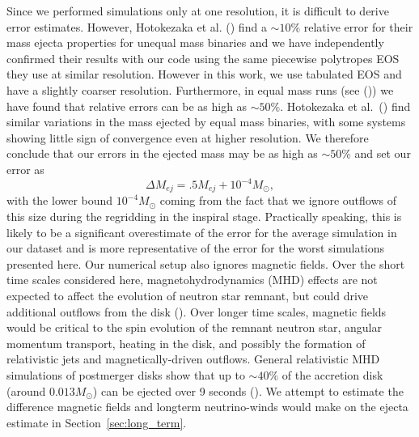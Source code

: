 Since we performed simulations only at one resolution, it is difficult to derive error estimates. However, Hotokezaka et al. (\cite{hotokezaka:13}) find a $\sim 10\%$ relative error for their mass ejecta properties for unequal mass binaries and we have independently confirmed their results with our code using the same piecewise polytropes EOS they use at similar resolution. However in this work, we use tabulated EOS and have a slightly coarser resolution. Furthermore, in equal mass runs (see (\cite{foucart:2015gaa})) we have found that relative errors can be as high as $\sim 50\%$. Hotokezaka et al.~(\cite{hotokezaka:13}) find similar variations in the mass ejected by equal mass binaries, with some systems showing little sign of convergence even at higher resolution. We therefore conclude that our errors in the ejected mass may be as high as $\sim 50\%$ and set our error as
%
\begin{equation}
\label{eqn:error}
  \Delta M_{ej} = .5M_{ej} + 10^{-4}M_\odot,
\end{equation}
%
with the lower bound $10^{-4}M_\odot$ coming from the fact that we ignore outflows of this size during the regridding in the inspiral stage. Practically speaking, this is likely to be a significant overestimate of the error for the average simulation in our dataset and is more representative of the error for the worst simulations presented here. %
Our numerical setup also ignores magnetic fields. Over the short time scales considered here, magnetohydrodynamics (MHD) effects are not expected to affect the evolution of neutron star remnant, but could drive additional outflows from the disk (\cite{kiuchi2014,neilsen2014magnetized}). Over longer time scales, magnetic fields would be critical to the spin evolution of the remnant neutron star, angular momentum transport, heating in the disk, and possibly the formation of relativistic jets and magnetically-driven outflows. General relativistic MHD simulations of postmerger disks show
that up to $\sim 40\%$ of the accretion disk (around $0.013M_\odot$) can be ejected over 9 seconds (\cite{fernandez2019long}). We attempt to estimate the difference magnetic fields and longterm neutrino-winds would make on the ejecta estimate in Section~\ref{sec:long_term}.

